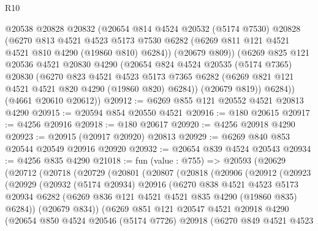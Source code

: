 \begin{lexlean}{R10}
\begin{coremodule}
        @20538
        @20828
        @20832
        (@20654
          @814
          @4524
          @20532
          (@5174 @7530)
          @20828
          (@6270
            @813
            @4521
            @4523
            @5173
            @7530
            @6282
            (@6269 @811 @121 @4521 @4521 @810 @4290 (@19860 @810) @6284))
          (@20679 @809))
        (@6269
          @825
          @121
          @20536
          @4521
          @20830
          @4290
          (@20654
            @824
            @4524
            @20535
            (@5174 @7365)
            @20830
            (@6270
              @823
              @4521
              @4523
              @5173
              @7365
              @6282
              (@6269 @821 @121 @4521 @4521 @820 @4290 (@19860 @820) @6284))
            (@20679 @819))
          @6284))
      (@4661 @20610 @20612))
@20912 := @6269 @855 @121 @20552 @4521 @20813 @4290
@20915 := @20594 @854 @20550 @4521
@20916 := @180 @20615
@20917 := @4256 @20916
@20918 := @180 @20617
@20920 := @4256 @20918 @4290
@20923 := @20915 (@20917 @20920) @20813
@20929 := @6269 @840 @853 @20544 @20549 @20916 @20920
@20932 := @20654 @839 @4524 @20543
@20934 := @4256 @835 @4290
@21018 := fun (value : @755) =>
  @20593
    (@20629
      (@20712
        (@20718
          (@20729
            (@20801
              (@20807
                (@20818
                  (@20906
                    (@20912
                      (@20923
                        (@20929
                          (@20932
                            (@5174 @20934)
                            @20916
                            (@6270
                              @838
                              @4521
                              @4523
                              @5173
                              @20934
                              @6282
                              (@6269 @836 @121 @4521 @4521 @835 @4290 (@19860 @835) @6284))
                            (@20679 @834))
                          (@6269
                            @851
                            @121
                            @20547
                            @4521
                            @20918
                            @4290
                            (@20654
                              @850
                              @4524
                              @20546
                              (@5174 @7726)
                              @20918
                              (@6270
                                @849
                                @4521
                                @4523

\end{coremodule}
\end{lexlean}

